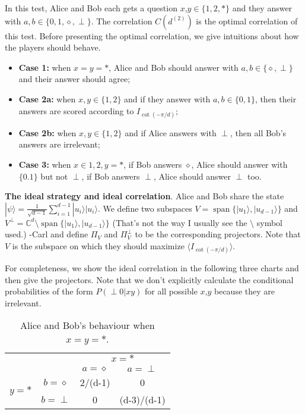 \documentclass[11pt,letterpaper]{article}
\newcommand{\ket}[1]{|#1\rangle}
\DeclareMathOperator{\spn}{span}
\newcommand{\C}{\mathbb{C}}
\newcommand{\1}{\mathbb{1}}
\newcommand{\dr}[1]{d^{(#1)}}
\newcommand{\pr}[2]{P(#1|#2)}
\def\carl#1{{\color{blue} #1 -Carl}}
\theoremstyle{definition}
\begin{document}
In this test, Alice and Bob each gets a question $x$,$y \in \{ 1, 2, \ast\}$ and 
they answer with $a,b \in \{0,1,\diamond,\perp\}$. 
The correlation $C(\dr{2})$ is the optimal correlation of this test.
Before presenting the optimal correlation, we give intuitions about how the players should behave.
\begin{itemize}
	\item \textbf{Case 1:} when $x = y = \ast$, Alice and Bob should answer with $a, b \in \{\diamond, \perp\}$ and 
	their answer should agree;
	\item \textbf{Case 2a:} when $x,y \in \{1,2\}$ and if they answer with $a,b \in \{0,1\}$, then
	their answers are scored according to $I_{\cot(-\pi/d)}$;
	\item \textbf{Case 2b:} when $x,y \in \{1,2\}$ and if Alice answers with $\perp$, then all Bob's answers are irrelevant;
	\item \textbf{Case 3:} when $x \in {1,2}, y = \ast$, if Bob answers $\diamond$, 
	Alice should answer with $\{0.1\}$ but not $\perp$,
	if Bob answers $\perp$, Alice should answer $\perp$ too.
\end{itemize}
\textbf{The ideal strategy and ideal correlation}. Alice and Bob share the state $\ket{\psi} =\frac{1}{\sqrt{d-1}} \sum_{i=1}^{d-1} \ket{u_i}\ket{u_i}$.
We define two subspaces $V = \spn\{\ket{u_1}, \ket{u_{d-1}}\}$ and $V^\perp = \C^d \setminus\spn\{\ket{u_1}, \ket{u_{d-1}}\}$ \carl{(That's not 
the way I usually see the $\setminus$ symbol used.)} and
define $\Pi_V$ and $\Pi_{V}^\perp$ to be the corresponding projectors. Note that $V$ is the subspace on which they should
maximize $\langle I_{\cot(-\pi/d)} \rangle$.

For completeness, we show the ideal correlation in the following three charts and then give the projectors. 
Note that we don't explicitly calculate the conditional probabilities of the form $\pr{\perp 0}{xy}$ for all possible $x$,$y$ 
because they are irrelevant.
\begin{table}[H]
\begin{center}
\begin{tabular}{|c|c||c|c|}
\hline
\multicolumn{2}{|c|}{} &
\multicolumn{2}{|c|}{$x=\ast$}\\
\cline{3-4}
\multicolumn{2}{|c|}{} &$a = \diamond$ & $a = \perp$ \\
\hline
\hline
\multirow{2}{*}{$y = \ast$} & $b=\diamond$ & 2/(d-1) & 0 \\
\cline{2-4}
&$b=\perp$ & 0 & (d-3)/(d-1) \\
\hline
\end{tabular}
\caption{Alice and Bob's behaviour when $x=y=\ast$.}
\end{center}
\end{table}
\end{document}
